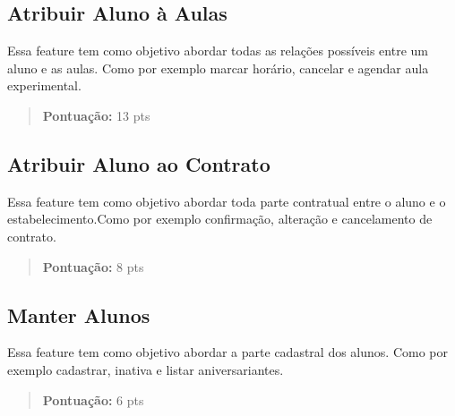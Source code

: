 \subsection[Atribuir Aluno à Aulas]{Atribuir Aluno à Aulas}
Essa feature tem como objetivo abordar todas as relações possíveis entre
um aluno e as aulas. Como por exemplo marcar horário, cancelar e agendar aula
experimental.
\begin{quote}
    \textbf{Pontuação:} 13 pts
\end{quote}

\subsection[Atribuir Aluno ao Contrato]{Atribuir Aluno ao Contrato}
Essa feature tem como objetivo abordar toda parte contratual entre o aluno e o
estabelecimento.Como por exemplo confirmação, alteração e cancelamento de
contrato.
\begin{quote}
    \textbf{Pontuação:} 8 pts
\end{quote}

\subsection[Manter Alunos]{Manter Alunos}
Essa feature tem como objetivo abordar a parte cadastral dos alunos. Como por
exemplo cadastrar, inativa e listar aniversariantes.
\begin{quote}
    \textbf{Pontuação:} 6 pts
\end{quote}
